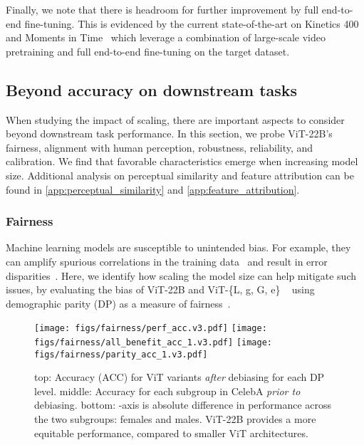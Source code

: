 \documentclass{article}
\newcommand{\chonk}{\mbox{ViT-22B}\xspace}
\begin{document}
Finally, we note that there is headroom for further improvement by full end-to-end fine-tuning. This is evidenced by the current state-of-the-art on Kinetics 400~\citep{wang2022internvideo} and Moments in Time~\citep{yu2022coca} which leverage a combination of large-scale video pretraining and full end-to-end fine-tuning on the target dataset. 



 
\subsection{Beyond accuracy on downstream tasks}
When studying the impact of scaling, there are important aspects to consider beyond downstream task performance. In this section, we probe \chonk's fairness, alignment with human perception, robustness, reliability, and calibration. We find that favorable characteristics emerge when increasing model size. Additional analysis on perceptual similarity and feature attribution can be found in \cref{app:perceptual_similarity} and \cref{app:feature_attribution}.


\subsubsection{Fairness}\label{sect::fairness}
Machine learning models are susceptible to unintended bias. For example, they can amplify spurious correlations in the training data~\citep{hendricks2018women,caliskan2017semantics,zhao2017men,wang2020towards} and result in error disparities~\citep{zhao2017men,buolamwini2018gender,deuschel2020uncovering}. 
Here, we identify how scaling the model size can help mitigate such issues, by evaluating the bias of \chonk  and ViT-\{L, g, G, e\} ~\citep{zhai2022scaling,chen2022pali} using demographic parity (DP) as a measure of fairness~\citep{dwork2012fairness,zafar2017fairness}.

\begin{figure}[hbt!]
    \centering
    \texttt{[image: figs/fairness/perf\_acc.v3.pdf]}
    \texttt{[image: figs/fairness/all\_benefit\_acc\_1.v3.pdf]}
    \texttt{[image: figs/fairness/parity\_acc\_1.v3.pdf]}
    \vspace{-10pt}
    \caption{{\sc top:} Accuracy (ACC) for ViT variants \emph{after} debiasing for each DP level.  {\sc middle}: Accuracy for each subgroup in CelebA \emph{prior to} debiasing. {\sc bottom}:  -axis is absolute difference in performance across the two subgroups: females and males. \chonk provides a more equitable performance, compared to smaller ViT architectures.}
    \label{fig:fairness:main}
    \vspace{-10pt}
\end{figure}
\end{document}
